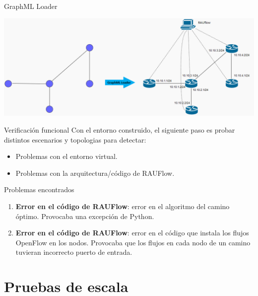 \documentclass[xcolor=svgnames]{beamer}
\begin{document}
\begin{frame}{GraphML Loader}
	\begin{center}
		\includegraphics[scale=0.4]{loader}
	\end{center}
\end{frame}

\begin{frame}{Verificación funcional}
	Con el entorno construido, el siguiente paso es probar distintos escenarios y topologias para detectar:
	\begin{itemize}
		\item Problemas con el entorno virtual.
		\item Problemas con la arquitectura/código de RAUFlow.
	\end{itemize}
\end{frame}

\begin{frame}{Problemas encontrados}
	\begin{enumerate}
		\item \textbf{Error en el código de RAUFlow}: error en el algoritmo del camino óptimo. Provocaba una excepción de Python.
		\item \textbf{Error en el código de RAUFlow}: error en el código que instala los flujos OpenFlow en los nodos. Provocaba que los flujos en cada nodo de un camino tuvieran incorrecto puerto de entrada.
	\end{enumerate}
\end{frame}

\section{Pruebas de escala}

\begin{frame}{}
	\tableofcontents[currentsection]
\end{frame}
\end{document}
